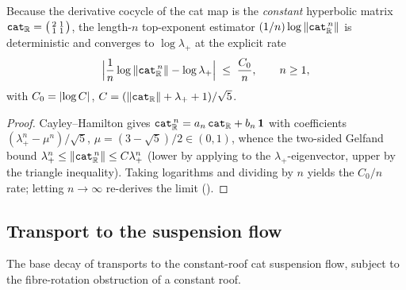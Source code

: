\begin{theorem}\label{catExponent_rate}
  \leanok
  Because the derivative cocycle of the cat map is the \emph{constant} hyperbolic matrix
  \(\texttt{cat}_{\mathbb{R}} = \bigl(\begin{smallmatrix}2&1\\1&1\end{smallmatrix}\bigr)\), the length-\(n\)
  top-exponent estimator \((1/n)\log\left\lVert \texttt{cat}_{\mathbb{R}}^{\,n} \right\rVert\) is deterministic and converges to
  \(\log\lambda_+\) at the explicit rate
  \[
    \Bigl\lvert \frac1n\log\left\lVert \texttt{cat}_{\mathbb{R}}^{\,n} \right\rVert - \log\lambda_+ \Bigr\rvert
      \;\le\; \frac{C_0}{n}, \qquad n\ge 1,
  \]
  with \(C_0 = \left\lvert \log C \right\rvert\), \(C = (\left\lVert \texttt{cat}_{\mathbb{R}} \right\rVert + \lambda_+ + 1)/\sqrt5\).
\end{theorem}
\begin{proof}\leanok
  Cayley--Hamilton gives \(\texttt{cat}_{\mathbb{R}}^{\,n} = a_n\,\texttt{cat}_{\mathbb{R}} + b_n\,\mathbf 1\) with
  coefficients \((\lambda_+^n - \mu^n)/\sqrt5\), \(\mu = (3-\sqrt5)/2\in(0,1)\), whence the two-sided
  Gelfand bound \(\lambda_+^n \le \left\lVert \texttt{cat}_{\mathbb{R}}^{\,n} \right\rVert \le C\lambda_+^n\) (lower by applying
  to the \(\lambda_+\)-eigenvector, upper by the triangle inequality). Taking logarithms and dividing
  by \(n\) yields the \(C_0/n\) rate; letting \(n\to\infty\) re-derives the limit
  ().
\end{proof}

\subsection{Transport to the suspension flow}

The base decay of  transports to the constant-roof cat suspension flow, subject
to the fibre-rotation obstruction of a constant roof.

